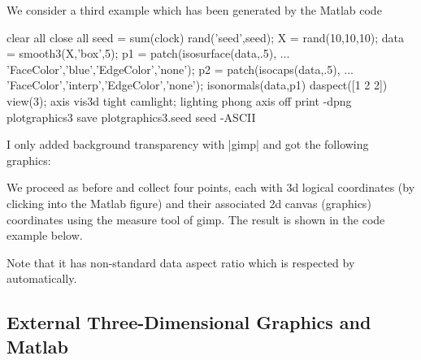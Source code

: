 {{We consider a third example which has been generated by the Matlab code
%
\begin{codeexample}
clear all
close all
seed = sum(clock)
rand('seed',seed);
X = rand(10,10,10);
data = smooth3(X,'box',5);
p1 = patch(isosurface(data,.5), ...
   'FaceColor','blue','EdgeColor','none');
p2 = patch(isocaps(data,.5), ...
    'FaceColor','interp','EdgeColor','none');
isonormals(data,p1)
daspect([1 2 2])
view(3); axis vis3d tight
camlight; lighting phong
axis off
print -dpng plotgraphics3
save  plotgraphics3.seed seed -ASCII %
\end{codeexample}
%
\noindent I only added background transparency with |gimp| and got the following
graphics:

{\setlength{\fboxsep}{0pt}%
\centering%
%
}

We proceed as before and collect four points, each with 3d logical coordinates
(by clicking into the Matlab figure) and their associated 2d canvas (graphics)
coordinates using the measure tool of gimp. The result is shown in the code
example below.
%
\begin{codeexample}[]
\end{codeexample}
%
\noindent Note that it has non-standard data aspect ratio which is respected by
\PGFPlots{} automatically.


\subsection*{External Three-Dimensional Graphics and Matlab}
\label{sec:plotgraphics3d:matlabscript}

}}
